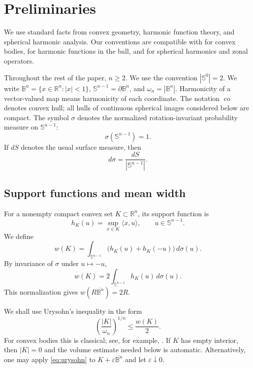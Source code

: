\documentclass[11pt,reqno]{amsart}
\theoremstyle{remark}
\begin{document}
\section{Preliminaries}

We use standard facts from convex geometry, harmonic function theory, and
spherical harmonic analysis.  Our conventions are compatible with
\cite{Schneider} for convex bodies, \cite{AxlerBourdonRamey} for harmonic
functions in the ball, and \cite{DaiXu} for spherical harmonics and zonal
operators.

Throughout the rest of the paper, $n\ge2$.  We use the convention
$|\mathbb S^0|=2$.  We write $\mathbb B^n=\{x\in\mathbb R^n:|x|<1\}$,
$\mathbb S^{n-1}=\partial\mathbb B^n$, and $\omega_n=|\mathbb B^n|$.
Harmonicity of a vector-valued map means harmonicity of each coordinate.
The notation $\operatorname{co}$ denotes convex hull; all hulls of
continuous spherical images considered below are compact.
The symbol $\sigma$ denotes the normalized rotation-invariant
probability measure on $\mathbb S^{n-1}$:
\[
 \sigma(\mathbb S^{n-1})=1.
\]
If $dS$ denotes the usual surface measure, then
\[
 d\sigma=\frac{dS}{|\mathbb S^{n-1}|}.
\]

\subsection{Support functions and mean width}

For a nonempty compact convex set $K\subset\mathbb R^n$, its support function
is
\[
 h_K(u)=\sup_{x\in K}\langle x,u\rangle,\qquad u\in\mathbb S^{n-1}.
\]
We define
\[
 w(K)=\int_{\mathbb S^{n-1}}
       \bigl(h_K(u)+h_K(-u)\bigr)\,d\sigma(u).
\]
By invariance of $\sigma$ under $u\mapsto-u$,
\begin{equation}\label{eq:meanwidth}
 w(K)=2\int_{\mathbb S^{n-1}}h_K(u)\,d\sigma(u).
\end{equation}
This normalization gives $w(R\overline{\mathbb B^n})=2R$.

We shall use Urysohn's inequality in the form
\begin{equation}\label{eq:urysohn}
 \left(\frac{|K|}{\omega_n}\right)^{1/n}\le \frac{w(K)}2.
\end{equation}
For convex bodies this is classical; see, for example,
\cite{Schneider}.  If $K$ has empty interior, then $|K|=0$ and the volume
estimate needed below is automatic.  Alternatively, one may apply
\eqref{eq:urysohn} to $K+\varepsilon\overline{\mathbb B^n}$ and let
$\varepsilon\downarrow0$.
\end{document}
